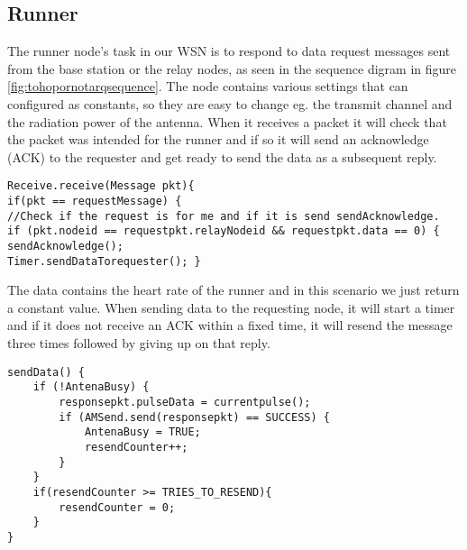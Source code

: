 \subsection{Runner}\label{sc:runner}

The runner node's task in our WSN is to respond to data request messages sent from the base station or the relay nodes, as seen in the sequence digram in figure \ref{fig:tohopornotarqsequence}. The node contains various settings that can configured as constants, so they are easy to change eg. the transmit channel and the radiation power of the antenna. When it receives a packet it will check that the packet was intended for the runner and if so it will send an acknowledge (ACK) to the requester and get ready to send the data as a subsequent reply.

\begin{minipage}[t]{0.95\linewidth}
\begin{lstlisting}[label={lst:runner1}, caption={Runner receives requests and responds.}]
Receive.receive(Message pkt){
if(pkt == requestMessage) {
//Check if the request is for me and if it is send sendAcknowledge.
if (pkt.nodeid == requestpkt.relayNodeid && requestpkt.data == 0) {
sendAcknowledge();
Timer.sendDataTorequester(); }
\end{lstlisting}
\end{minipage}

The data contains the heart rate of the runner and in this scenario we just return a constant value. When sending data to the requesting node, it will start a timer and if it does not receive an ACK within a fixed time, it will resend the message three times followed by giving up on that reply.

\begin{minipage}[t]{0.95\linewidth}
\begin{lstlisting}[label={lst:runner2}, caption={Runner sends data packet with runner's heart rate.}]
sendData() {
	if (!AntenaBusy) {
		responsepkt.pulseData = currentpulse();
		if (AMSend.send(responsepkt) == SUCCESS) {
			AntenaBusy = TRUE;
			resendCounter++;
		}
	}		
	if(resendCounter >= TRIES_TO_RESEND){
		resendCounter = 0; 
	}
}
\end{lstlisting}
\end{minipage}
